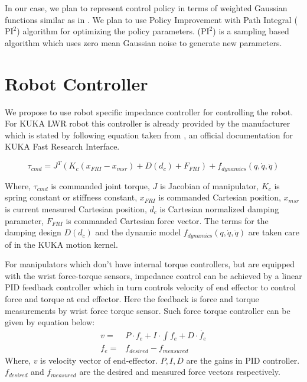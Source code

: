 \documentclass[thesis]{mas_proposal}
\begin{document}
In our case, we plan to represent control policy in terms of weighted Gaussian functions similar as in \cite{nemec2017door}. We plan to use Policy Improvement with Path Integral ($\text{PI}^{2}$) algorithm\cite{theodorou2010learning} for optimizing the policy parameters. ($\text{PI}^{2}$) is a sampling based algorithm which uses zero mean Gaussian noise to generate new parameters.   

\section{Robot Controller}

We propose to use robot specific impedance controller for controlling the robot. For KUKA LWR robot this controller is already provided by the manufacturer which is stated by following equation taken from \cite{schreiber2010fast}, an official documentation for KUKA Fast Research Interface.

\begin{equation}
\tau_{cmd} = J^{T}(K_{c}(x_{FRI} - x_{msr}) + D(d_{c}) + F_{FRI}) + f_{dynamics}(q, \dot{q}, \ddot{q})
\end{equation}

Where,
$\tau_{cmd}$ is commanded joint torque, $J$ is Jacobian of manipulator, $K_{c}$ is spring constant or stiffness constant, $x_{FRI}$ is commanded Cartesian position, $x_{msr}$ is current measured Cartesian position, $d_{c}$ is Cartesian normalized damping parameter, $F_{FRI}$ is commanded Cartesian force vector. The terms for the damping design $D(d_{c})$ and the dynamic model $f_{dynamics}(q, \dot{q}, \ddot{q})$ are taken care of in the KUKA motion
kernel.   

For manipulators which don't have internal torque controllers, but are equipped with the wrist force-torque sensors, impedance control can be achieved by a linear PID feedback controller which in turn controls velocity of end effector to control force and torque at end effector. Here the feedback is force and torque measurements by wrist force torque sensor. Such force torque controller can be given by equation below:
\begin{align}
	v =& P \cdot f_{e} + I \cdot \int f_{e} + D \cdot \dot{f_{e}} \\
	f_{e} =& f_{desired} - f_{measured}
\end{align}   
Where, $v$ is velocity vector of end-effector. $P, I, D$ are the gains in PID controller. $f_{desired}$ and $f_{measured}$ are the desired and measured force vectors respectively. 
\end{document}
